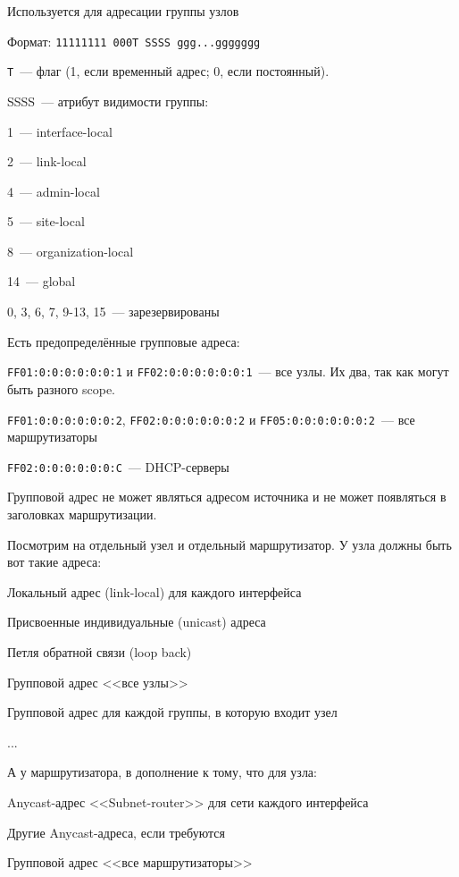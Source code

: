 Используется для адресации группы узлов

Формат: {\tt 11111111 000T SSSS ggg...ggggggg}

{\tt T}~--- флаг (1, если временный адрес; 0, если постоянный).

SSSS~--- атрибут видимости группы:
\begin{MyItemize}
    \item 1~--- interface-local
    \item 2~--- link-local
    \item 4~--- admin-local
    \item 5~--- site-local
    \item 8~--- organization-local
    \item 14~--- global
    \item 0, 3, 6, 7, 9-13, 15~--- зарезервированы
\end{MyItemize}

Есть предопределённые групповые адреса:
\begin{MyItemize}
    \item {\tt FF01:0:0:0:0:0:0:1} и {\tt FF02:0:0:0:0:0:0:1}~--- все узлы. Их два, так как могут быть разного scope.
    \item {\tt FF01:0:0:0:0:0:0:2}, {\tt FF02:0:0:0:0:0:0:2} и {\tt FF05:0:0:0:0:0:0:2}~--- все маршрутизаторы
    \item {\tt FF02:0:0:0:0:0:0:С}~--- DHCP-серверы
\end{MyItemize}

Групповой адрес не может являться адресом источника и не может появляться в заголовках маршрутизации.


Посмотрим на отдельный узел и отдельный маршрутизатор. У узла должны быть вот такие адреса:
\begin{MyItemize}
    \item Локальный адрес (link-local) для каждого интерфейса
    \item Присвоенные индивидуальные (unicast) адреса
    \item Петля обратной связи (loop back)
    \item Групповой адрес <<все узлы>>
    \item Групповой адрес для каждой группы, в которую входит узел
    \item ...
\end{MyItemize}

А у маршрутизатора, в дополнение к тому, что для узла:
\begin{MyItemize}
    \item Anycast-адрес <<Subnet-router>> для сети каждого интерфейса
    \item Другие Anycast-адреса, если требуются
    \item Групповой адрес <<все маршрутизаторы>>
\end{MyItemize}

